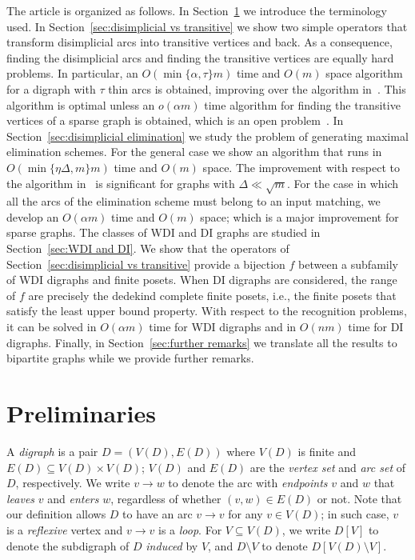 \documentclass[a4paper,11pt]{article}
\begin{document}
The article is organized as follows. In Section~\ref{sec:preliminaries} we introduce the terminology used.  In Section~\ref{sec:disimplicial vs transitive} we show two simple operators that transform disimplicial arcs into transitive vertices and back.  As a consequence, finding the disimplicial arcs and finding the transitive vertices are equally hard problems.  In particular, an $O(\min\{\alpha,\tau\}m)$ time and $O(m)$ space algorithm for a digraph with $\tau$ thin arcs is obtained, improving over the algorithm in~\cite{BomhoffMantheyDAM2013}.  This algorithm is optimal unless an $o(\alpha m)$ time algorithm for finding the transitive vertices of a sparse graph is obtained, which is an open problem~\cite{Spinrad2003}.  In Section~\ref{sec:disimplicial elimination} we study the problem of generating maximal elimination schemes.  For the general case we show an algorithm that runs in $O(\min\{\eta\Delta, m\}m)$ time and $O(m)$ space.  The improvement with respect to the algorithm in~\cite{Bomhoff2011} is significant for graphs with $\Delta \ll \sqrt{m}$.  For the case in which all the arcs of the elimination scheme must belong to an input matching, we develop an $O(\alpha m)$ time and $O(m)$ space; which is a major improvement for sparse graphs.  The classes of WDI and DI graphs are studied in Section~\ref{sec:WDI and DI}.  We show that the operators of Section~\ref{sec:disimplicial vs transitive} provide a bijection $f$ between a subfamily of WDI digraphs and finite posets.  When DI digraphs are considered, the range of $f$ are precisely the dedekind complete finite posets, i.e., the finite posets that satisfy the least upper bound property.  With respect to the recognition problems, it can be solved in $O(\alpha m)$ time for WDI digraphs and in $O(nm)$ time for DI digraphs.  Finally, in Section~\ref{sec:further remarks} we translate all the results to bipartite graphs while we provide further remarks.
  
\section{Preliminaries}\label{sec:preliminaries}

A \emph{digraph} is a pair $D = (V(D), E(D))$ where $V(D)$ is finite and $E(D) \subseteq V(D) \times V(D)$; $V(D)$ and $E(D)$ are the \emph{vertex set} and \emph{arc set} of $D$, respectively.  We write $v \to w$ to denote the arc with \emph{endpoints} $v$ and $w$ that \emph{leaves} $v$ and \emph{enters} $w$, regardless of whether $(v,w) \in E(D)$ or not.  Note that our definition allows $D$ to have an arc $v \to v$ for any $v \in V(D)$; in such case, $v$ is a \emph{reflexive} vertex and $v \to v$ is a \emph{loop}.  For $V \subseteq V(D)$, we write $D[V]$ to denote the subdigraph of $D$ \emph{induced} by $V$, and $D \setminus V$ to denote $D[V(D) \setminus V]$. 
\end{document}
